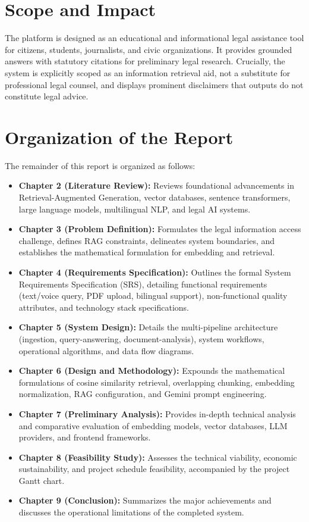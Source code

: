 \documentclass[12pt,a4paper]{report}
\begin{document}
\section{Scope and Impact}
The platform is designed as an educational and informational legal assistance tool for citizens, students, journalists, and civic organizations. It provides grounded answers with statutory citations for preliminary legal research. Crucially, the system is explicitly scoped as an information retrieval aid, not a substitute for professional legal counsel, and displays prominent disclaimers that outputs do not constitute legal advice.

\section{Organization of the Report}
The remainder of this report is organized as follows:
\begin{itemize}
    \item \textbf{Chapter 2 (Literature Review):} Reviews foundational advancements in Retrieval-Augmented Generation, vector databases, sentence transformers, large language models, multilingual NLP, and legal AI systems.
    \item \textbf{Chapter 3 (Problem Definition):} Formulates the legal information access challenge, defines RAG constraints, delineates system boundaries, and establishes the mathematical formulation for embedding and retrieval.
    \item \textbf{Chapter 4 (Requirements Specification):} Outlines the formal System Requirements Specification (SRS), detailing functional requirements (text/voice query, PDF upload, bilingual support), non-functional quality attributes, and technology stack specifications.
    \item \textbf{Chapter 5 (System Design):} Details the multi-pipeline architecture (ingestion, query-answering, document-analysis), system workflows, operational algorithms, and data flow diagrams.
    \item \textbf{Chapter 6 (Design and Methodology):} Expounds the mathematical formulations of cosine similarity retrieval, overlapping chunking, embedding normalization, RAG configuration, and Gemini prompt engineering.
    \item \textbf{Chapter 7 (Preliminary Analysis):} Provides in-depth technical analysis and comparative evaluation of embedding models, vector databases, LLM providers, and frontend frameworks.
    \item \textbf{Chapter 8 (Feasibility Study):} Assesses the technical viability, economic sustainability, and project schedule feasibility, accompanied by the project Gantt chart.
    \item \textbf{Chapter 9 (Conclusion):} Summarizes the major achievements and discusses the operational limitations of the completed system.
\end{itemize}
\end{document}

